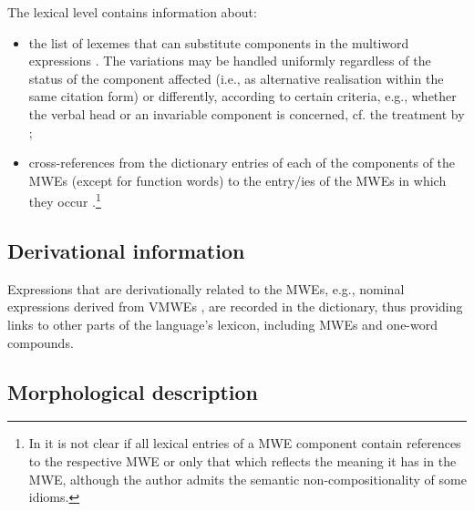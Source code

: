\documentclass[output=paper,colorlinks,citecolor=brown]{langscibook}
\begin{document}
The lexical level contains information about:
         \begin{itemize}
            \item the list of lexemes that can substitute components in the multiword expressions \citep{villavicencio-LexicalEncoding,gregoire-2007,przepiorkowski-etal-2014,hnatkova-etal-2019,markantonatou-etal-2019-idion,markantonatou-etal-in-prep,chapters/01}. The variations may be handled uniformly regardless of the status of the component affected (i.e., as alternative realisation within the same citation form) or differently, according to certain criteria, e.g., whether the verbal head or an invariable component is concerned, cf. the treatment by \citet{markantonatou-etal-2019-idion,markantonatou-etal-in-prep}; %
            \item cross-references from the dictionary entries of each of the components of the MWEs (except for function  words) to the entry/ies of the MWEs in which they occur \citep{villavicencio-LexicalEncoding,ECD}.\footnote{In \citet{ECD} it is not clear if all lexical entries of a MWE component contain references to the respective MWE or only that which reflects the meaning it has in the MWE, although the author admits the semantic non-compositionality of some idioms.}
        \end{itemize}

\subsection{Derivational information}

Expressions that are derivationally related to the MWEs, e.g., nominal expressions derived from VMWEs \citep{ECD,hnatkova-etal-2019,Monti2014}, are recorded in the dictionary, thus providing links to other parts of the language's lexicon, including MWEs and one-word compounds. 

\subsection{Morphological description} \label{subsec:morph-descr}
\end{document}
